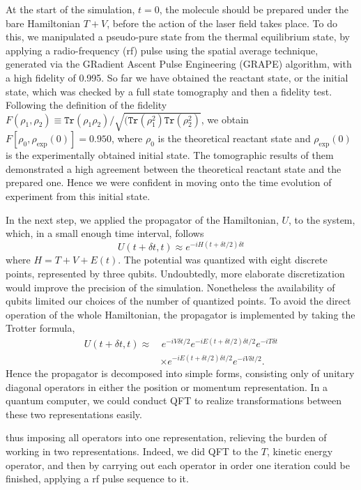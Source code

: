 \documentclass[8.5pt,twoside,twocolumn]{article}
\newcommand{\nl}{\nonumber \\}
\begin{document}
At the start of the simulation, $t = 0$,
the molecule should be prepared under the bare Hamiltonian $T + V$,
before the action of the laser field takes place.
To do this, we manipulated a pseudo-pure state from the
thermal equilibrium state, by applying a radio-frequency (rf)
pulse using the spatial average technique,\cite{spatial_averaging_1}
generated via the GRadient Ascent Pulse Engineering (GRAPE)
algorithm,\cite{GRAPE_1,NMR_readout,GRAPE_3} with a high fidelity of 0.995.
So far we have obtained the reactant state,
or the initial state, which was checked by a full state tomography
and then a fidelity test.
Following the definition of the fidelity $F(\rho_{1}, \rho_{2})\equiv \texttt{Tr}(\rho_1{\rho_2})/\sqrt{(\texttt{Tr}(\rho_1^2)\texttt{Tr}(\rho_2^2)}$,
we obtain $F[\rho_0, \rho_{\text{exp}}(0)]=0.950$,
where $\rho_0$ is the theoretical reactant state and
$\rho_{\text{exp}}(0)$ is the experimentally obtained initial state.
The tomographic results of them demonstrated
a high agreement between the theoretical reactant state
and the prepared one. Hence we were confident in moving onto the
time evolution of experiment from this initial state.

In the next step, we applied the propagator of the Hamiltonian,
$U$, to the system, which, in a small
enough time interval, follows
\[U(t+\delta t,t) \approx {e^{-iH(t+\delta t/2)\delta t}}\]
where $H = T + V + E(t)$.
The potential was quantized with eight discrete points,
represented by three qubits.
Undoubtedly, more elaborate discretization would
improve the precision of the simulation.
Nonetheless the availability of qubits limited our choices of
the number of quantized points.
To avoid the direct operation of the whole Hamiltonian,
the propagator is implemented by taking the Trotter formula,\cite{first_quantization_2,Trotter_1,Trotter_2}
\begin{align}\label{propagator}
 {U}(t+\delta t,t)\approx &\,
 e^{-i {V} \delta t/2} e^{-i {E} (t+\delta t/2)  \delta t/2}
 e^{-i {T} \delta t}   \nl & \times e^{-i {E} (t+\delta t/2)           \delta t/2}
 e^{-i {V} \delta t/2} .
\end{align}
Hence the propagator is decomposed into simple forms, consisting only of
unitary diagonal operators in either the position or momentum representation.
In a quantum computer, we could conduct QFT to realize transformations
between these two representations easily.

\iffalse

thus imposing all operators
into one representation,
relieving the burden of working in two representations.
Indeed, we did QFT to the $T$, kinetic energy operator,
and then by carrying out each operator
in order one iteration could be finished,
applying a rf pulse sequence to it.
\end{document}
